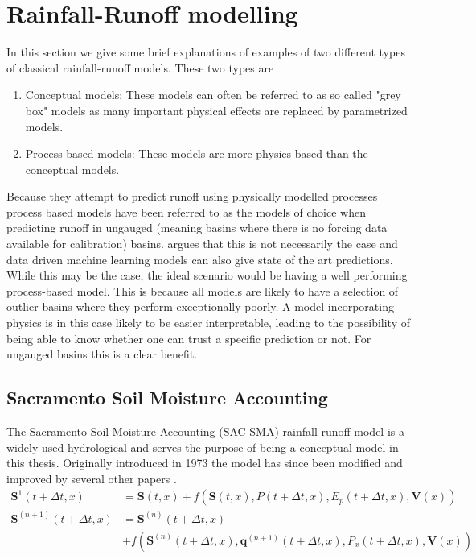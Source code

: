 \section{Rainfall-Runoff modelling}
In this section we give some brief explanations of examples of two different types 
of classical rainfall-runoff models. These two types are
\begin{enumerate}
    \item Conceptual models: These models can often be referred to as so called "grey box" models \citationneeded as many important physical effects are replaced by parametrized models.
    \item Process-based models: These models are more physics-based than the conceptual models. 
\end{enumerate}
Because they attempt to predict runoff using physically modelled processes process based models
have been referred to as the models of choice when predicting runoff in ungauged 
 (meaning basins where there is no forcing data available for calibration) basins. 
 \citet{lstm_third_paper} argues that this is not necessarily the case and data driven 
 machine learning models can also give state of the art predictions.
 While this may be the case, the ideal scenario would be having 
 a well performing process-based model. This is because all models are likely to 
 have a selection of outlier basins where they perform exceptionally poorly. A model 
 incorporating physics is in this case likely to be easier interpretable, leading 
 to the possibility of being able to know whether one can trust a specific prediction or not. 
 For ungauged basins this is a clear benefit.
\subsection{Sacramento Soil Moisture Accounting}
The Sacramento Soil Moisture Accounting (SAC-SMA) \citep{SAC-SMA} rainfall-runoff model is a widely 
used hydrological and serves the purpose of being a conceptual model in this thesis.
Originally introduced in 1973 the model has since been modified and improved by 
several other papers \citep{SAC-SMA-physics}.
\begin{align}
    \bm{S}^1(t + \Delta t,x) &= \bm{S}(t,x) + f\left(\bm{S}(t,x),P(t+\Delta t,x),E_p (t+\Delta t, x), \bm{V}(x) \right) \\
    \bm{S}^{(n+1)}(t+\Delta t,x) &= \bm{S}^{(n)}(t+\Delta t, x) \nonumber \\
    &+ f\left( \bm{S}^{(n)}(t+\Delta t, x), \bm{q}^{(n+1)}(t+\Delta t,x),P_x(t+\Delta t,x),\bm{V}(x)  \right)
\end{align}

